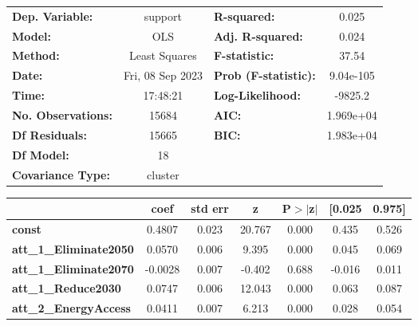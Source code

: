 \begin{center}
\begin{tabular}{lclc}
\toprule
\textbf{Dep. Variable:}              &     support      & \textbf{  R-squared:         } &     0.025   \\
\textbf{Model:}                      &       OLS        & \textbf{  Adj. R-squared:    } &     0.024   \\
\textbf{Method:}                     &  Least Squares   & \textbf{  F-statistic:       } &     37.54   \\
\textbf{Date:}                       & Fri, 08 Sep 2023 & \textbf{  Prob (F-statistic):} & 9.04e-105   \\
\textbf{Time:}                       &     17:48:21     & \textbf{  Log-Likelihood:    } &   -9825.2   \\
\textbf{No. Observations:}           &       15684      & \textbf{  AIC:               } & 1.969e+04   \\
\textbf{Df Residuals:}               &       15665      & \textbf{  BIC:               } & 1.983e+04   \\
\textbf{Df Model:}                   &          18      & \textbf{                     } &             \\
\textbf{Covariance Type:}            &     cluster      & \textbf{                     } &             \\
\bottomrule
\end{tabular}
\begin{tabular}{lcccccc}
                                     & \textbf{coef} & \textbf{std err} & \textbf{z} & \textbf{P$> |$z$|$} & \textbf{[0.025} & \textbf{0.975]}  \\
\midrule
\textbf{const}                       &       0.4807  &        0.023     &    20.767  &         0.000        &        0.435    &        0.526     \\
\textbf{att\_1\_Eliminate2050}       &       0.0570  &        0.006     &     9.395  &         0.000        &        0.045    &        0.069     \\
\textbf{att\_1\_Eliminate2070}       &      -0.0028  &        0.007     &    -0.402  &         0.688        &       -0.016    &        0.011     \\
\textbf{att\_1\_Reduce2030}          &       0.0747  &        0.006     &    12.043  &         0.000        &        0.063    &        0.087     \\
\textbf{att\_2\_EnergyAccess}        &       0.0411  &        0.007     &     6.213  &         0.000        &        0.028    &        0.054     \\

\end{tabular}
\end{center}
